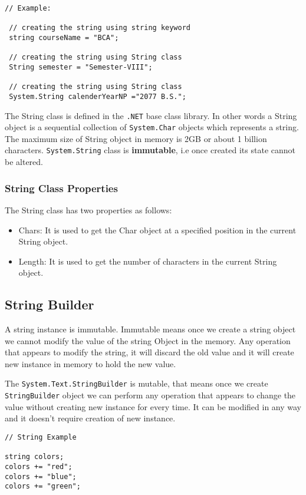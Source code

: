  \begin{lstlisting}[numbers=none]
 // Example:

 // creating the string using string keyword
 string courseName = "BCA";

 // creating the string using String class
 String semester = "Semester-VIII";

 // creating the string using String class
 System.String calenderYearNP ="2077 B.S.";
 \end{lstlisting}

The String class is defined in the \verb|.NET| base class library. In other words a String object is a sequential collection of \verb|System.Char| objects which represents a string. The maximum size of String object in memory is 2GB or about 1 billion characters. \verb|System.String| class is \textbf{immutable}, i.e once created its state cannot be altered.

\subsubsection*{String Class Properties}
The String class has two properties as follows:
\begin{itemize}
	\item Chars: It is used to get the Char object at a specified position in the current String object.
	\item Length: It is used to get the number of characters in the current String object.
\end{itemize}

\subsection{String Builder}

A string instance is immutable. Immutable means once we create a string object we cannot modify the value of the string Object in the memory. Any operation that appears to modify the string, it will discard the old value and it will create new instance in memory to hold the new value.

The \texttt{System.Text.StringBuilder} is mutable, that means once we create \texttt{StringBuilder} object we can perform any operation that appears to change the value without creating new instance for every time. It can be modified in any way and it doesn't require creation of new instance.

\begin{lstlisting}
// String Example

string colors;
colors += "red";
colors += "blue";
colors += "green";
\end{lstlisting}

